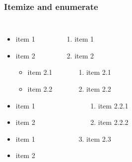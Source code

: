 \begin{frame}
	\frametitle{Itemize and enumerate}%
	\begin{columns}[t]
		\begin{itemize}
            \item item 1
            \item item 2
            \begin{itemize}
                \item item 2.1
                \item item 2.2
            \end{itemize}
            \item item 1
            \item item 2
            \item item 1
            \item item 2
        \end{itemize}
        \begin{enumerate}
            \item item 1
            \item item 2
            \begin{enumerate}
                \item item 2.1
                \item item 2.2
                \begin{enumerate}
                    \item item 2.2.1
                    \item item 2.2.2
                \end{enumerate}
                \item item 2.3 
            \end{enumerate}
        \end{enumerate}
	\end{columns}
\end{frame}